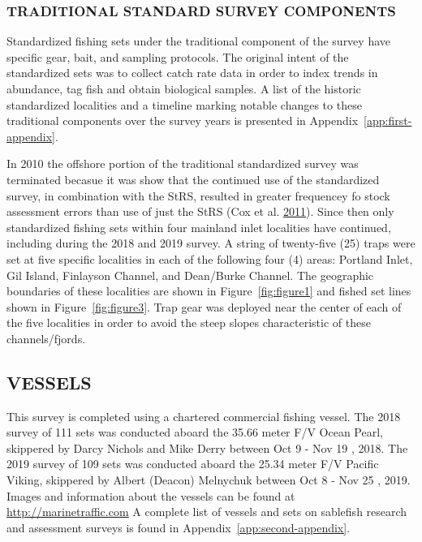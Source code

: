 \documentclass[12pt]{article}\usepackage[]{graphicx}\usepackage[]{color}
\begin{document}
\hypertarget{traditional-standard-survey-components}{%
\subsubsection{TRADITIONAL STANDARD SURVEY COMPONENTS}\label{traditional-standard-survey-components}}

Standardized fishing sets under the traditional component of the survey have specific gear, bait, and sampling protocols. The original intent of the standardized sets was to collect catch rate data in order to index trends in abundance, tag fish and obtain biological samples. A list of the historic standardized localities and a timeline marking notable changes to these traditional components over the survey years is presented in Appendix~\ref{app:first-appendix}.

In 2010 the offshore portion of the traditional standardized survey was terminated becasue it was show that the continued use of the standardized survey, in combination with the StRS, resulted in greater frequencey fo stock assessment errors than use of just the StRS (Cox et al. \protect\hyperlink{ref-Cox2011}{2011}). Since then only standardized fishing sets within four mainland inlet localities have continued, including during the 2018 and 2019 survey. A string of twenty-five (25) traps were set at five specific localities in each of the following four (4) areas: Portland Inlet, Gil Island, Finlayson Channel, and Dean/Burke Channel. The geographic boundaries of these localities are shown in Figure~\ref{fig:figure1} and fished set lines shown in Figure~\ref{fig:figure3}. Trap gear was deployed near the center of each of the five localities in order to avoid the steep slopes characteristic of these channels/fjords.

\hypertarget{vessels}{%
\subsection{VESSELS}\label{vessels}}

This survey is completed using a chartered commercial fishing vessel. The 2018 survey of 111 sets was conducted aboard the 35.66 meter F/V Ocean Pearl, skippered by Darcy Nichols and Mike Derry between Oct 9 - Nov 19 , 2018. The 2019 survey of 109 sets was conducted aboard the 25.34 meter F/V Pacific Viking, skippered by Albert (Deacon) Melnychuk between Oct 8 - Nov 25 , 2019. Images and information about the vessels can be found at \href{http://marinetraffic.com}{\underline{http://marinetraffic.com}} A complete list of vessels and sets on sablefish research and assessment surveys is found in Appendix~\ref{app:second-appendix}.
\end{document}
